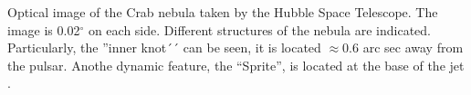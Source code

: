 \label{fig:knot}
Optical image of the Crab nebula taken by the Hubble Space Telescope. The image is 0.02$^\circ$ on each side. Different structures of the nebula are indicated. Particularly, the ''inner knot´´ can be seen, it is located $\approx 0.6$ arc sec away from the pulsar.  Anothe dynamic feature, the ``Sprite'', is located at the base of the jet  \citep[e.g.][]{hester2002}.  